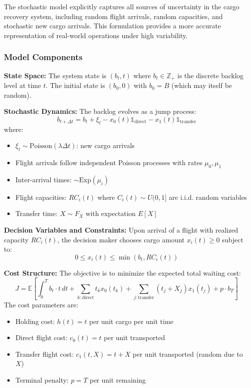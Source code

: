 \documentclass[opre,sglanonrev]{informs4}
\begin{document}
{\color{brown}
The stochastic model explicitly captures all sources of uncertainty in the cargo recovery system, including random flight arrivals, random capacities, and stochastic new cargo arrivals. This formulation provides a more accurate representation of real-world operations under high variability.

\subsubsection{Model Components}

\textbf{State Space:} The system state is \( (b_t, t) \) where \( b_t \in \mathbb{Z}_+ \) is the discrete backlog level at time \( t \). The initial state is \( (b_0, 0) \) with \( b_0 = B \) (which may itself be random).

\textbf{Stochastic Dynamics:} The backlog evolves as a jump process:
\[
b_{t+\Delta t} = b_t + \xi_t - x_0(t) \mathbb{1}_{\text{direct}} - x_1(t) \mathbb{1}_{\text{transfer}}
\]
where:
\begin{itemize}
    \item \( \xi_t \sim \text{Poisson}(\lambda \Delta t) \): new cargo arrivals
    \item Flight arrivals follow independent Poisson processes with rates \( \mu_0, \mu_1 \)
    \item Inter-arrival times: \( \sim \text{Exp}(\mu_i) \)
    \item Flight capacities: \( RC_i(t) \) where \( C_i(t) \sim U(0,1] \) are i.i.d. random variables
    \item Transfer time: \( X \sim F_X \) with expectation \( E[X] \)
\end{itemize}

\textbf{Decision Variables and Constraints:} Upon arrival of a flight with realized capacity \( RC_i(t) \), the decision maker chooses cargo amount \( x_i(t) \geq 0 \) subject to:
\[
0 \leq x_i(t) \leq \min(b_t, RC_i(t))
\]

\textbf{Cost Structure:} The objective is to minimize the expected total waiting cost:
\[
J = \mathbb{E}\left[ \int_0^T b_t \cdot t \, dt + \sum_{k: \text{direct}} t_k x_0(t_k) + \sum_{j: \text{transfer}} (t_j + X_j) x_1(t_j) + p \cdot b_T \right]
\]
The cost parameters are:
\begin{itemize}
    \item Holding cost: \( h(t) = t \) per unit cargo per unit time
    \item Direct flight cost: \( c_0(t) = t \) per unit transported
    \item Transfer flight cost: \( c_1(t, X) = t + X \) per unit transported (random due to \( X \))
    \item Terminal penalty: \( p = T \) per unit remaining
\end{itemize}

}
\end{document}
